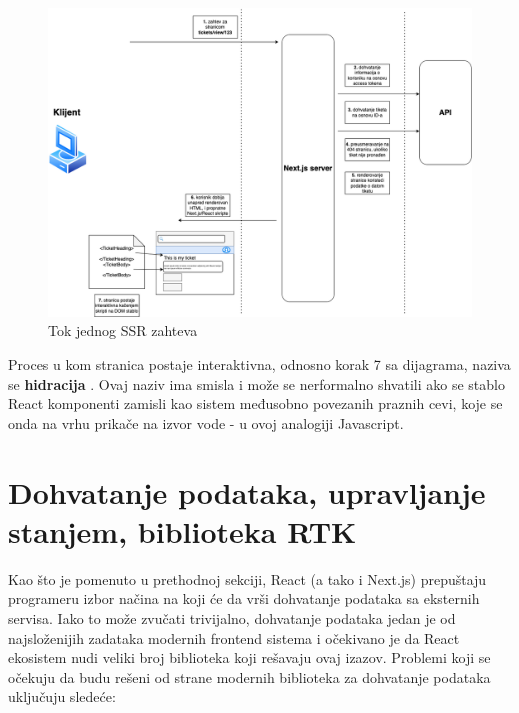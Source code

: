 \documentclass[12pt,oneside]{memoir}
\begin{document}
\begin{figure}[h]
  \centering
  \includegraphics[width=1\textwidth]{docs/images/ch_4/nextjs_flow.png} 
  \caption{Tok jednog SSR zahteva}
  \label{fig:ssrdiagram}
\end{figure}

Proces u kom stranica postaje interaktivna, odnosno korak 7 sa dijagrama, naziva se \textbf{hidracija} \cite{reactdocscomponents}. Ovaj naziv ima smisla i može se nerformalno shvatili ako se stablo React komponenti zamisli kao sistem međusobno povezanih praznih cevi, koje se onda na vrhu prikače na izvor vode - u ovoj analogiji Javascript.

\newpage
\label{sec:datafetchingandconfiguration}
\section{Dohvatanje podataka, upravljanje stanjem, biblioteka RTK}

Kao što je pomenuto u prethodnoj sekciji, React (a tako i Next.js) prepuštaju programeru izbor načina na koji će da vrši dohvatanje podataka sa eksternih servisa. Iako to može zvučati trivijalno, dohvatanje podataka jedan je od najsloženijih zadataka modernih frontend sistema i očekivano je da React ekosistem nudi veliki broj biblioteka koji rešavaju ovaj izazov. Problemi koji se očekuju da budu rešeni od strane modernih biblioteka za dohvatanje podataka uključuju sledeće:
\end{document}
